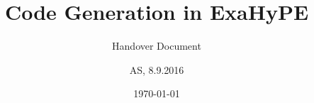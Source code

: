 \documentclass{acm_proc_article-sp}
\begin{document}
\title{Code Generation in ExaHyPE}%
\subtitle{Handover Document}
%
%
%
%
%

%
\author{
%
%
\alignauthor
AS, 8.9.2016
}

\date{\today}
\end{document}
